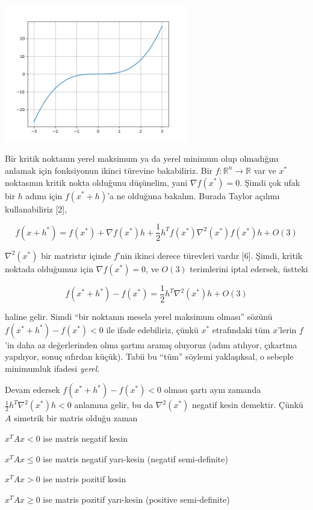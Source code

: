 \documentclass[12pt,fleqn]{article}\usepackage{../../common}
\begin{document}
\includegraphics[height=6cm]{func_40_autograd_01.png}

Bir kritik noktanın yerel maksimum ya da yerel minimum olup olmadığını
anlamak için fonksiyonun ikinci türevine bakabiliriz. Bir
$f: \mathbb{R}^n \to \mathbb{R}$ var ve $x^\ast$ noktasının kritik nokta
olduğunu düşünelim, yani $\nabla f(x^\ast) = 0$. Şimdi çok ufak bir $h$ adımı
için $f(x^\ast + h)$'a ne olduğuna bakalım. Burada Taylor açılımı
kullanabiliriz [2], 

$$
f(x + h^\ast) = 
f(x^\ast) + \nabla f(x^\ast) h + 
\frac{1}{2} h^T f(x^\ast) \nabla^2 (x^\ast) f(x^\ast) h + 
O(3)
$$

$\nabla^2 (x^\ast)$ bir matristır içinde $f$'nin ikinci derece türevleri
vardır [6]. Şimdi, kritik noktada olduğumuz için $\nabla f(x^\ast) = 0$, ve
$O(3)$ terimlerini iptal edersek, üstteki

$$
f(x^\ast + h^\ast) - f(x^\ast) = \frac{1}{2} h^T \nabla^2 (x^\ast)  h + O(3)
$$

haline gelir. Simdi ``bir noktanın mesela yerel maksimum olması'' sözünü
$f(x^\ast + h^\ast) - f(x^\ast) < 0$ ile ifade edebiliriz, çünkü $x^\ast$ etrafındaki
tüm $x$'lerin $f$'in daha az değerlerinden olma şartını aramış oluyoruz
(adım atılıyor, çıkartma yapılıyor, sonuç sıfırdan küçük). Tabii bu ``tüm''
söylemi yaklaşıksal, o sebeple minimumluk ifadesi {\em yerel}.

Devam edersek $f(x^\ast + h^\ast) - f(x^\ast) < 0$ olması şartı aynı zamanda
$\frac{1}{2} h^T \nabla^2 (x^\ast) h < 0$ anlamına gelir, bu da
$\nabla^2 (x^\ast )$ negatif kesin demektir. Çünkü $A$ simetrik bir matris
olduğu zaman

$x^TAx < 0$ ise matris negatif kesin

$x^TAx \le 0$ ise matris negatif yarı-kesin (negatif semi-definite)

$x^TAx > 0$ ise matris pozitif kesin

$x^TAx \ge 0$ ise matris pozitif yarı-kesin (positive semi-definite)
\end{document}
